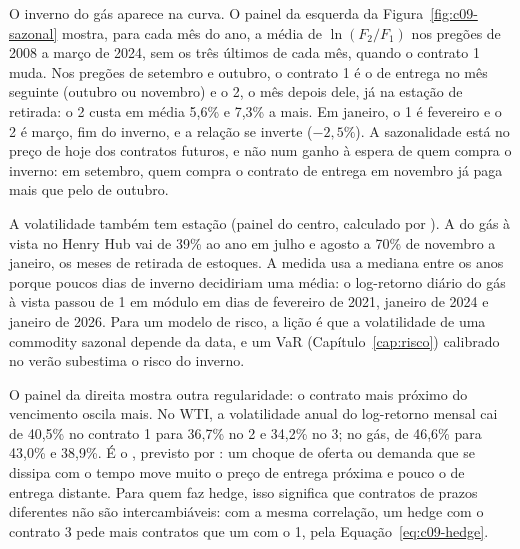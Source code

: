 O inverno do gás aparece na curva. O painel da esquerda da Figura~\ref{fig:c09-sazonal} mostra, para cada mês do ano, a média de $\ln(F_2/F_1)$ nos pregões de 2008 a março de 2024, sem os três últimos de cada mês, quando o contrato 1 muda. Nos pregões de setembro e outubro, o contrato 1 é o de entrega no mês seguinte (outubro ou novembro) e o 2, o mês depois dele, já na estação de retirada: o 2 custa em média 5,6\% e 7,3\% a mais. Em janeiro, o 1 é fevereiro e o 2 é março, fim do inverno, e a relação se inverte ($-2,5\%$). A sazonalidade está no preço de hoje dos contratos futuros, e não num ganho à espera de quem compra o inverno: em setembro, quem compra o contrato de entrega em novembro já paga mais que pelo de outubro.


A volatilidade também tem estação (painel do centro, calculado por ). A do gás à vista no Henry Hub vai de 39\% ao ano em julho e agosto a 70\% de novembro a janeiro, os meses de retirada de estoques. A medida usa a mediana entre os anos porque poucos dias de inverno decidiriam uma média: o log-retorno diário do gás à vista passou de 1 em módulo em dias de fevereiro de 2021, janeiro de 2024 e janeiro de 2026. Para um modelo de risco, a lição é que a volatilidade de uma commodity sazonal depende da data, e um VaR (Capítulo~\ref{cap:risco}) calibrado no verão subestima o risco do inverno.

O painel da direita mostra outra regularidade: o contrato mais próximo do vencimento oscila mais. No WTI, a volatilidade anual do log-retorno mensal cai de 40,5\% no contrato 1 para 36,7\% no 2 e 34,2\% no 3; no gás, de 46,6\% para 43,0\% e 38,9\%. É o , previsto por \citet{samuelson1965}: um choque de oferta ou demanda que se dissipa com o tempo move muito o preço de entrega próxima e pouco o de entrega distante. Para quem faz hedge, isso significa que contratos de prazos diferentes não são intercambiáveis: com a mesma correlação, um hedge com o contrato 3 pede mais contratos que um com o 1, pela Equação~\eqref{eq:c09-hedge}.

